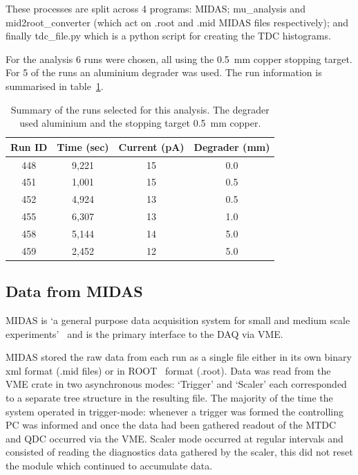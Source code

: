 These processes are split across 4 programs: MIDAS; mu\_analysis and mid2root\_converter (which act on .root and .mid MIDAS files respectively); and finally tdc\_file.py which is a python script for creating the TDC histograms.

For the analysis 6 runs were chosen, all using the 0.5~mm copper stopping target. For 5 of the runs an aluminium degrader was used. The run information is summarised in table~\ref{tab:run_summary}.
\begin{table}
	\begin{center}
	\begin{tabular}{c|c|c|c}
		Run ID & Time (sec) & Current (pA) & Degrader (mm) \\
		\hline
		448    & 9,221      & 15           & 0.0   \\
		451    & 1,001      & 15           & 0.5   \\
		452    & 4,924      & 13           & 0.5   \\
		455    & 6,307      & 13           & 1.0   \\
		458    & 5,144      & 14           & 5.0   \\
		459    & 2,452      & 12           & 5.0   \\
	\end{tabular}
	\end{center}
	\caption{Summary of the runs selected for this analysis. The degrader used aluminium and the stopping target 0.5~mm copper.}
	\label{tab:run_summary}
\end{table} 
\subsection{Data from MIDAS} %
\label{sub:data_from_midas}
MIDAS is `a general purpose data acquisition system for small and medium scale experiments'~\cite{ritt2012midas} and is the primary interface to the DAQ via VME. 

MIDAS stored the raw data from each run as a single file either in its own binary xml format (.mid files) or in ROOT~\cite{Brun199781} format (.root). Data was read from the VME crate in two asynchronous modes: `Trigger' and `Scaler' each corresponded to a separate tree structure in the resulting file. The majority of the time the system operated in trigger-mode: whenever a trigger was formed the controlling PC was informed and once the data had been gathered readout of the MTDC and QDC occurred via the VME. Scaler mode occurred at regular intervals and consisted of reading the diagnostics data gathered by the scaler, this did not reset the module which continued to accumulate data. 

